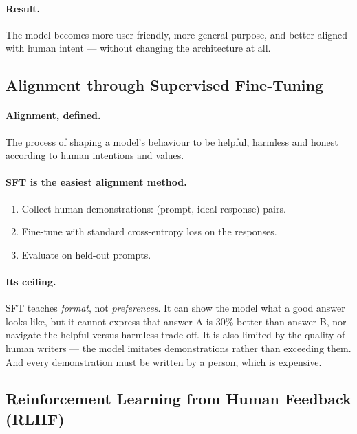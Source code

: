 \documentclass[11pt,a4paper]{article}
\begin{document}
\paragraph{Result.} The model becomes more user-friendly, more general-purpose, and better
aligned with human intent --- without changing the architecture at all.

\subsection{Alignment through Supervised Fine-Tuning}

\paragraph{Alignment, defined.} The process of shaping a model's behaviour to be helpful,
harmless and honest according to human intentions and values.

\paragraph{SFT is the easiest alignment method.}
\begin{enumerate}
\item Collect human demonstrations: (prompt, ideal response) pairs.
\item Fine-tune with standard cross-entropy loss on the responses.
\item Evaluate on held-out prompts.
\end{enumerate}

\paragraph{Its ceiling.} SFT teaches \emph{format}, not \emph{preferences}. It can show the
model what a good answer looks like, but it cannot express that answer A is 30\% better than
answer B, nor navigate the helpful-versus-harmless trade-off. It is also limited by the
quality of human writers --- the model imitates demonstrations rather than exceeding them.
And every demonstration must be written by a person, which is expensive.

\subsection{Reinforcement Learning from Human Feedback (RLHF)}
\end{document}
